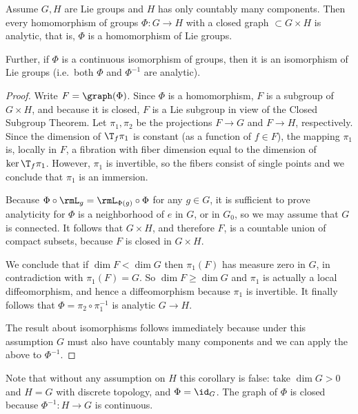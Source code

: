 \begin{cor}[{{\cite[Prop.~1.10.8]{DK}}}]
    Assume $G,H$ are Lie groups and $H$ has only countably many components. Then every homomorphism of groups $\Phi:G\to H$ with a closed graph $\subset G\times H$ is analytic, that is, $\Phi$ is a homomorphism of Lie groups.

    Further, if $\Phi$ is a continuous isomorphism of groups, then it is an isomorphism of Lie groups (i.e.~both $\Phi$ and $\Phi^{-1}$ are analytic).
\end{cor}
\begin{proof}
    Write $F=\graph(\Phi)$. Since $\Phi$ is a homomorphism, $F$ is a subgroup of $G\times H$, and because it is closed, $F$ is a Lie subgroup in view of the Closed Subgroup Theorem. Let $\pi_1,\pi_2$ be the projections $F\to G$ and $F\to H$, respectively. Since the dimension of $\T_f\pi_1$ is constant (as a function of $f\in F$), the mapping $\pi_1$ is, locally in $F$, a fibration with fiber dimension equal to the dimension of $\ker \T_f\pi_1$. However, $\pi_1$ is invertible, so the fibers consist of single points and we conclude that $\pi_1$ is an immersion.

    Because $\Phi\circ \rmL_g=\rmL_{\Phi(g)}\circ\Phi$ for any $g\in G$, it is sufficient to prove analyticity for $\Phi$ is a neighborhood of $e$ in $G$, or in $G_0$, so we may assume that $G$ is connected. It follows that $G\times H$, and therefore $F$, is a countable union of compact subsets, because $F$ is closed in $G\times H$.

    We conclude that if $\dim F<\dim G$ then $\pi_1(F)$ has measure zero in $G$, in contradiction with $\pi_1(F)=G$. So $\dim F\geq \dim G$ and $\pi_1$ is actually a local diffeomorphism, and hence a diffeomorphism because $\pi_1$ is invertible. It finally follows that $\Phi=\pi_2\circ\pi_1^{-1}$ is analytic $G\to H$.

    The result about isomorphisms follows immediately because under this assumption $G$ must also have countably many components and we can apply the above to $\Phi^{-1}$.
\end{proof}

\begin{rem}
    Note that without any assumption on $H $ this corollary is false: take $\dim G>0$ and $H=G$ with discrete topology, and $\Phi=\id_G$. The graph of $\Phi$ is closed because $\Phi^{-1}:H\to G$ is continuous.
\end{rem}



